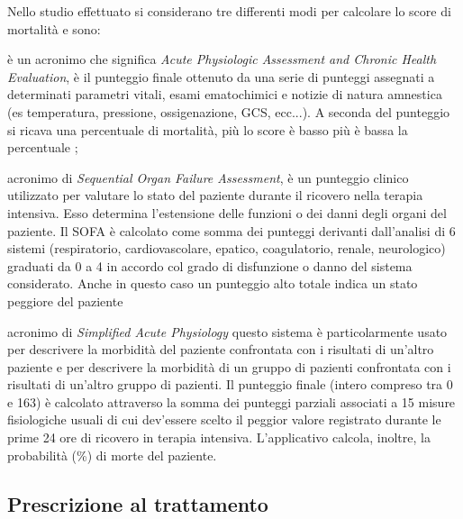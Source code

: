 Nello studio effettuato si considerano tre differenti modi per calcolare lo score di mortalità e sono: 
\begin{description}
	 \parsep
	\item[APACHI Score] è un acronimo che significa \textit{Acute Physiologic Assessment and Chronic Health Evaluation}, è il punteggio finale ottenuto da una serie di punteggi assegnati a determinati parametri vitali, esami ematochimici e notizie di natura amnestica (es temperatura, pressione, ossigenazione, GCS, ecc...).
	A seconda del punteggio si ricava una percentuale di mortalità, più lo score è basso più è bassa la percentuale ;
	\item[SOFA Score] acronimo di \textit{Sequential Organ Failure Assessment}, è un punteggio clinico utilizzato per valutare lo stato del paziente durante il ricovero nella terapia intensiva. Esso determina l’estensione delle funzioni o dei danni degli organi del paziente.
	Il SOFA è calcolato come somma dei punteggi derivanti dall'analisi di 6 sistemi (respiratorio, cardiovascolare, epatico, coagulatorio, renale, neurologico) graduati da 0 a 4 in accordo col grado di disfunzione o danno del sistema considerato. Anche in questo caso un punteggio alto totale indica un stato peggiore del paziente
	\item[SAP Score] acronimo di \textit{Simplified Acute Physiology} 	questo sistema è particolarmente usato per descrivere la morbidità del paziente confrontata con i risultati di un’altro paziente e per descrivere la morbidità di un gruppo di pazienti confrontata con i risultati di un’altro gruppo di pazienti.
	Il punteggio finale (intero compreso tra 0 e 163) è calcolato attraverso la somma dei punteggi parziali associati a 15 misure fisiologiche usuali di cui dev'essere scelto il peggior valore registrato durante le prime 24 ore di ricovero in terapia intensiva.
	L'applicativo calcola, inoltre, la probabilità (\%) di morte del paziente.
\end{description}


\subsection{Prescrizione al trattamento}


